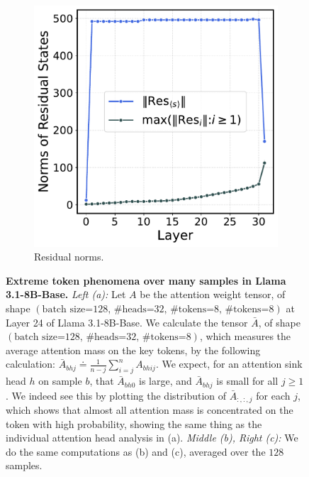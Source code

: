 \begin{figure}[h]
\begin{subfigure}{0.31\textwidth}
    \end{subfigure}
        \hfill
    \begin{subfigure}{0.32\textwidth}
        \caption{Residual norms.}
        \includegraphics[width=\textwidth]{Figures/more_samples_statics/res_peak_batch.pdf}
    \end{subfigure}
    
    \caption{\textbf{Extreme token phenomena over many samples in Llama 3.1-8B-Base.} \textit{Left (a):} Let \(A\) be the attention weight tensor, of shape \((\text{batch size=128, \# heads=32, \# tokens=8, \# tokens=8})\) at Layer 24 of Llama 3.1-8B-Base. We calculate the tensor \(\bar{A}\), of shape \((\text{batch size=128, \# heads=32, \# tokens=8})\), which measures the average attention mass on the key tokens, by the following calculation: \(\bar{A}_{bhj} \doteq \frac{1}{n-j}\sum_{i = j}^{n}A_{bhij}\). We expect, for an attention sink head \(h\) on sample \(b\), that \(\bar{A}_{bh0}\) is large, and \(\bar{A}_{bhj}\) is small for all \(j \geq 1\). We indeed see this by plotting the distribution of \(\bar{A}_{:, :, j}\) for each \(j\), which shows that almost all attention mass is concentrated on the \bos token with high probability, showing the same thing as the individual attention head analysis in  (a). \textit{Middle (b), Right (c):} We do the same computations as  (b) and (c), averaged over the \(128\) samples.}
    \label{fig:extreme_tokens_llama_31_many_samples}
\end{figure}

